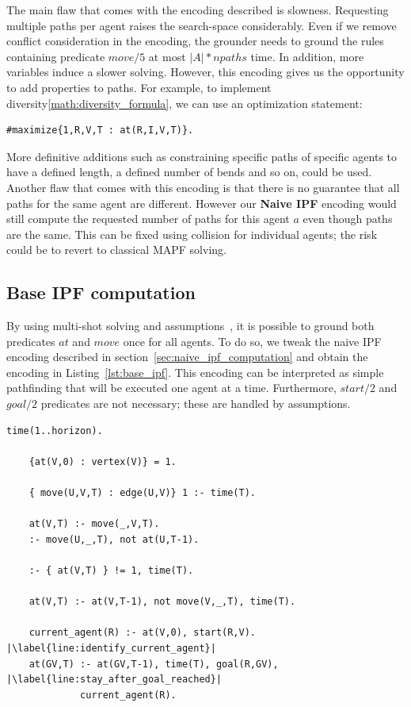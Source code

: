 The main flaw that comes with the encoding described is slowness. Requesting multiple paths per agent raises the search-space considerably. Even if we remove conflict consideration in the encoding,  the grounder needs to ground the rules containing predicate \(move/5\) at most \(|A| * npaths\) time. In addition, more variables induce a slower solving. 
However, this encoding gives us the opportunity to add properties to paths. For example, to implement diversity\ref{math:diversity_formula}, we can use an optimization statement:

\begin{minipage}[H]{\linewidth}
\begin{lstlisting}[style=mystyle]
    #maximize{1,R,V,T : at(R,I,V,T)}.
\end{lstlisting}
\end{minipage}

More definitive additions such as constraining specific paths of specific agents to have a defined length, a defined number of bends and so on, could be used.
Another flaw that comes with this encoding is that there is no guarantee that all paths for the same agent are different. However our \textbf{Naive IPF} encoding would still compute the requested number of paths for this agent \(a\) even though paths are the same. This can be fixed using collision for individual agents; the risk could be to revert to classical MAPF solving.

\subsection{Base IPF computation}\label{sec:base_ipf_computation}

By using multi-shot solving and assumptions~\cite{karoscwa21a}, it is  possible to ground both predicates \(at\) and \(move\) once for all agents. To do so, we tweak the naive IPF encoding described in section~\ref{sec:naive_ipf_computation} and obtain the encoding in Listing~\ref{lst:base_ipf}. This encoding can be interpreted as simple pathfinding that will be executed one agent at a time. Furthermore, \(start/2\) and \(goal/2\) predicates are not necessary; these are handled by assumptions.


\begin{minipage}[H]{\linewidth}
\begin{lstlisting}[style=mystyle, caption={Base IPF computation}, label={lst:base_ipf}]
    time(1..horizon).

    {at(V,0) : vertex(V)} = 1.

    { move(U,V,T) : edge(U,V)} 1 :- time(T).

    at(V,T) :- move(_,V,T).
    :- move(U,_,T), not at(U,T-1).

    :- { at(V,T) } != 1, time(T).

    at(V,T) :- at(V,T-1), not move(V,_,T), time(T).

    current_agent(R) :- at(V,0), start(R,V). |\label{line:identify_current_agent}|
    at(GV,T) :- at(GV,T-1), time(T), goal(R,GV), |\label{line:stay_after_goal_reached}| 
             current_agent(R). 
\end{lstlisting}
\end{minipage}

